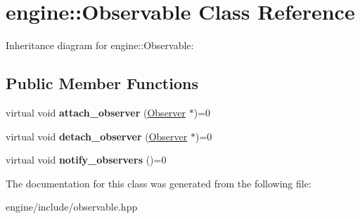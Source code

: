\hypertarget{classengine_1_1_observable}{}\section{engine\+:\+:Observable Class Reference}
\label{classengine_1_1_observable}


Inheritance diagram for engine\+:\+:Observable\+:
\subsection*{Public Member Functions}
\begin{DoxyCompactItemize}
\item 
virtual void {\bfseries attach\+\_\+observer} (\hyperlink{classengine_1_1_observer}{Observer} $\ast$)=0\hypertarget{classengine_1_1_observable_ad30f82c76dc6a63e30608b10124aac14}{}\label{classengine_1_1_observable_ad30f82c76dc6a63e30608b10124aac14}

\item 
virtual void {\bfseries detach\+\_\+observer} (\hyperlink{classengine_1_1_observer}{Observer} $\ast$)=0\hypertarget{classengine_1_1_observable_a4cb6be2f6d4a4d0979ea788848d5dce9}{}\label{classengine_1_1_observable_a4cb6be2f6d4a4d0979ea788848d5dce9}

\item 
virtual void {\bfseries notify\+\_\+observers} ()=0\hypertarget{classengine_1_1_observable_a8db7a2e368f7acd12e40d6329d4606af}{}\label{classengine_1_1_observable_a8db7a2e368f7acd12e40d6329d4606af}

\end{DoxyCompactItemize}


The documentation for this class was generated from the following file\+:\begin{DoxyCompactItemize}
\item 
engine/include/observable.\+hpp\end{DoxyCompactItemize}
